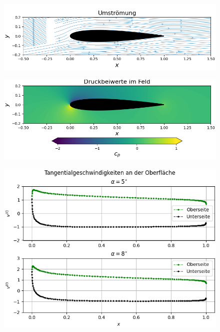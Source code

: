 \begin{figure}[H]
\begin{center} \includegraphics[scale=0.66]{figures/naca0012stream.png} \end{center}
\end{figure}
\begin{figure}[H]
\begin{center} \includegraphics[scale=0.66]{figures/naca0012contourcp.png} \end{center}
\end{figure}
\newpage
\begin{figure}[H]
\begin{center} \includegraphics[scale=0.77]{figures/naca0012vtlines.png} \end{center}
\end{figure}

